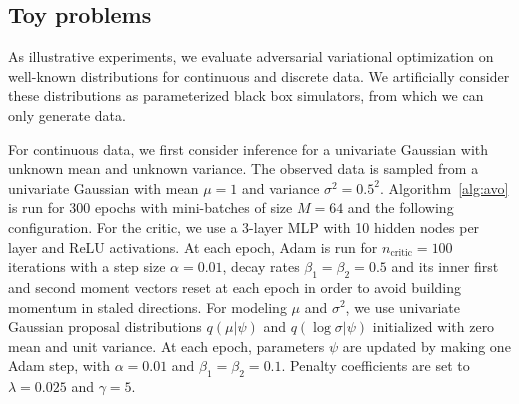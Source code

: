 \documentclass[twocolumn,superscriptaddress,aps]{revtex4-1}
\theoremstyle{plain}
\begin{document}
\subsection{Toy problems}

As illustrative experiments, we evaluate adversarial variational optimization on
well-known distributions for continuous and discrete data. We artificially
consider these distributions as parameterized black box simulators, from which
we can only generate data.

For continuous data, we first consider inference for
a univariate Gaussian with unknown mean and
unknown variance. The observed data is sampled from a univariate Gaussian with
mean $\mu = 1$ and variance $\sigma^2 = 0.5^2$. Algorithm~\ref{alg:avo} is run
for 300 epochs with mini-batches of size $M=64$ and the following configuration.
For the critic, we use a 3-layer MLP with 10 hidden nodes per layer and ReLU
activations. At each epoch, Adam is run for $n_\text{critic}=100$ iterations
with a step size $\alpha=0.01$, decay rates $\beta_1=\beta_2=0.5$ and its inner
first and second moment vectors reset at each epoch in order to avoid building
momentum in staled directions.  For modeling $\mu$ and $\sigma^2$, we use
univariate Gaussian proposal distributions $q(\mu|\psi)$ and $q(\log
\sigma|\psi)$ initialized with zero mean and unit variance. At each epoch,
parameters $\psi$ are updated by making one Adam step, with $\alpha=0.01$ and
$\beta_1=\beta_2=0.1$. Penalty coefficients are set to $\lambda=0.025$ and
$\gamma=5$.
\end{document}
